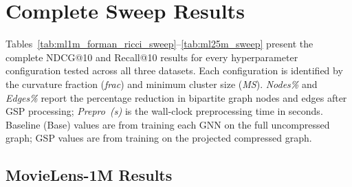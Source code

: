 \section{Complete Sweep Results}\label{sec:complete_sweep}

Tables~\ref{tab:ml1m_forman_ricci_sweep}--\ref{tab:ml25m_sweep} present the complete NDCG@10 and Recall@10 results for every hyperparameter configuration tested across all three datasets. Each configuration is identified by the curvature fraction (\textit{frac}) and minimum cluster size (\textit{MS}). \textit{Nodes\%} and \textit{Edges\%} report the percentage reduction in bipartite graph nodes and edges after GSP processing; \textit{Prepro~(s)} is the wall-clock preprocessing time in seconds. Baseline (Base) values are from training each GNN on the full uncompressed graph; GSP values are from training on the projected compressed graph.

\subsection*{MovieLens-1M Results}
